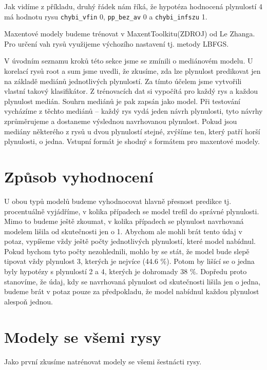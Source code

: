 \documentclass[12pt,a4paper]{report}
\begin{document}
Jak vidíme z příkladu, druhý řádek nám říká, že hypotéza hodnocená plynulostí 4 má hodnotu rysu \texttt{chybi\_vfin} 0, \texttt{pp\_bez\_av} 0 a \texttt{chybi\_infszu} 1.

Maxentové modely budeme trénovat v MaxentToolkitu(ZDROJ) od Le Zhanga. Pro určení vah rysů využijeme výchozího nastavení tj. metody LBFGS.

V úvodním seznamu kroků této sekce jsme se zmínili o mediánovém modelu. U korelací rysů root a sum jsme uvedli, že zkusíme, zda lze plynulost predikovat jen na základě mediánů jednotlivých plynulostí. Za tímto účelem jsme vytvořili vlastní takový klasifikátor. Z trénovacích dat si vypočítá pro každý rys a každou plynulost medián. Souhrn mediánů je pak zapsán jako model. Při testování vycházíme z těchto mediánů -- každý rys vydá jeden návrh plynulosti, tyto návrhy zprůměrujeme a dostaneme výslednou navrhovanou plynulost. Pokud jsou mediány některého z rysů u dvou plynulostí stejné, zvýšíme ten, který patří horší plynulosti, o jedna. Vstupní formát je shodný s formátem pro maxentové modely.

\section{Způsob vyhodnocení}
U obou typů modelů budeme vyhodnocovat hlavně přesnost predikce tj. procentuálně vyjádříme, v kolika případech se model trefil do správné plynulosti. Mimo to budeme ještě zkoumat, v kolika případech se plynulost navrhovaná modelem lišila od skutečnosti jen o 1. Abychom ale mohli brát tento údaj v potaz, vypíšeme vždy ještě počty jednotlivých plynulostí, které model nabídnul. Pokud bychom tyto počty nezohlednili, mohlo by se stát, že model bude slepě tipovat vždy plynulost 3, kterých je nejvíce (44.6 \%). Potom by lišící se o jedna byly hypotézy s plynulostí 2 a 4, kterých je dohromady 38 \%. Dopředu proto stanovíme, že údaj, kdy se navrhovaná plynulost od skutečnosti lišila jen o jedna, budeme brát v potaz pouze za předpokladu, že model nabídnul každou plynulost alespoň jednou. 


\section{Modely se všemi rysy}
Jako první zkusíme natrénovat modely se všemi šestnácti rysy.
\end{document}

